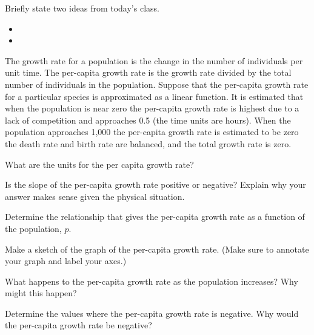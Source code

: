 \postClass

\begin{problem}
\item Briefly state two ideas from today's class.
  \begin{itemize}
  \item
  \item
  \end{itemize}
\item The growth rate for a population is the change in the number of
  individuals per unit time. The per-capita growth rate is the growth
  rate divided by the total number of individuals in the population.
  Suppose that the per-capita growth rate for a particular species is
  approximated as a linear function. It is estimated that when the
  population is near zero the per-capita growth rate is highest due to
  a lack of competition and approaches 0.5 (the time units are
  hours). When the population approaches 1,000 the per-capita growth
  rate is estimated to be zero the death rate and birth rate are
  balanced, and the total growth rate is zero.
  \begin{subproblem}
    \item What are the units for the per capita growth rate?
    \item Is the slope of the per-capita growth rate positive or
      negative? Explain why your answer makes sense given the physical
      situation.
    \item Determine the relationship that gives the per-capita growth
      rate as a function of the population, $p$.
    \item Make a sketch of the graph of the per-capita growth
      rate. (Make sure to annotate your graph and label your axes.)
    \item What happens to the per-capita growth rate as the population
      increases? Why might this happen?
    \item Determine the values where the per-capita growth rate is
      negative. Why would the per-capita growth rate be negative?
  \end{subproblem}
\end{problem}


